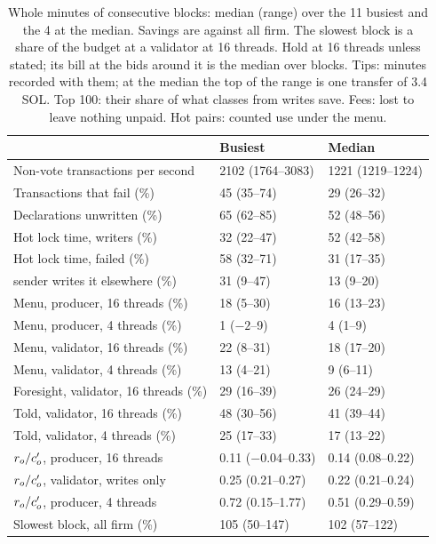 \begin{table}[t]
\centering
\caption{Whole minutes of consecutive blocks: median (range) over the 11 busiest and the 4 at the median. Savings are against all firm. The slowest block is a share of the budget at a validator at 16 threads. Hold at 16 threads unless stated; its bill at the bids around it is the median over blocks. Tips: minutes recorded with them; at the median the top of the range is one transfer of 3.4 SOL. Top 100: their share of what classes from writes save. Fees: lost to leave nothing unpaid. Hot pairs: counted use under the menu.}
\label{tab:windows}
\scriptsize
\setlength{\tabcolsep}{2pt}
\begin{tabular}{@{}lll@{}}
\toprule
 & Busiest & Median \\
\midrule
Non-vote transactions per second & 2102 (1764--3083) & 1221 (1219--1224) \\
Transactions that fail (\%) & 45 (35--74) & 29 (26--32) \\
Declarations unwritten (\%) & 65 (62--85) & 52 (48--56) \\
Hot lock time, writers (\%) & 32 (22--47) & 52 (42--58) \\
Hot lock time, failed (\%) & 58 (32--71) & 31 (17--35) \\
\quad sender writes it elsewhere (\%) & 31 (9--47) & 13 (9--20) \\
Menu, producer, 16 threads (\%) & 18 (5--30) & 16 (13--23) \\
Menu, producer, 4 threads (\%) & 1 ($-2$--9) & 4 (1--9) \\
Menu, validator, 16 threads (\%) & 22 (8--31) & 18 (17--20) \\
Menu, validator, 4 threads (\%) & 13 (4--21) & 9 (6--11) \\
Foresight, validator, 16 threads (\%) & 29 (16--39) & 26 (24--29) \\
Told, validator, 16 threads (\%) & 48 (30--56) & 41 (39--44) \\
Told, validator, 4 threads (\%) & 25 (17--33) & 17 (13--22) \\
$r_o/c'_o$, producer, 16 threads & 0.11 ($-0.04$--0.33) & 0.14 (0.08--0.22) \\
$r_o/c'_o$, validator, writes only & 0.25 (0.21--0.27) & 0.22 (0.21--0.24) \\
$r_o/c'_o$, producer, 4 threads & 0.72 (0.15--1.77) & 0.51 (0.29--0.59) \\
Slowest block, all firm (\%) & 105 (50--147) & 102 (57--122) \\

\end{tabular}
\end{table}
